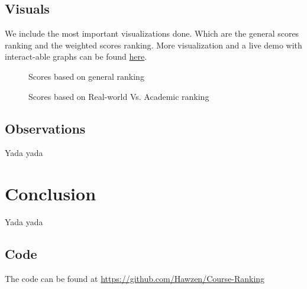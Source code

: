 \documentclass[12pt,a4paper]{article}
\begin{document}
\subsection{Visuals}
We include the most important visualizations done. Which are the general scores ranking and the weighted scores ranking. More visualization and a live demo with interact-able graphs can be found \href{http://courses.hawzen.me}{here}.

\begin{figure}
    \centering
    \hskip-1.7cm 
    \caption{Scores based on general ranking}
    \label{fig:my_label}
\end{figure}

\begin{figure}
    \centering
    \caption{Scores based on Real-world Vs. Academic ranking}
    \label{fig:my_label}
\end{figure}

\clearpage

\subsection{Observations}
Yada yada

\section{Conclusion}
Yada yada

\subsection{Code}
The code can be found at \url{https://github.com/Hawzen/Course-Ranking}
\end{document}
